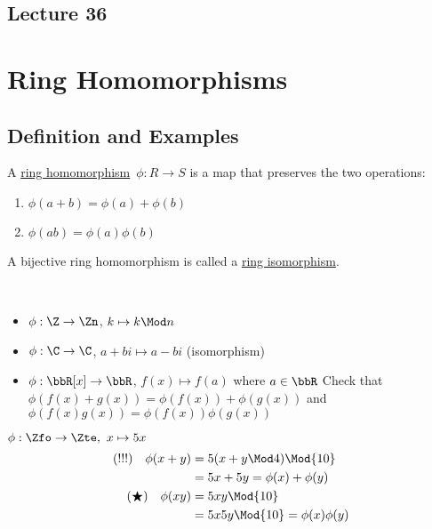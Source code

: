 \subsection*{Lecture 36} %

\section{Ring Homomorphisms}
\subsection{Definition and Examples}
  \begin{definition}
    A \uline{ring homomorphism}\  \( \phi: R\to S \) is a map that preserves the two operations:
    \begin{enumerate}
      \item \( \phi(a+b) = \phi(a) + \phi(b) \)
      \item \( \phi(ab) = \phi(a)\phi(b) \)
    \end{enumerate}
    A bijective ring homomorphism is called a \uline{ring isomorphism}.
  \end{definition}

\begin{examples}\
  \begin{itemize}
    \item \( \phi:\Z\to\Zn \), \( k\mapsto k\Mod n \)
    \item \( \phi:\C\to\C \), \( a+bi\mapsto a-bi \) (isomorphism)
    \item \( \phi:\bbR[x]\to\bbR \), \( f(x)\mapsto f(a) \) where \( a\in\bbR \)
    Check that \( \phi(f(x) + g(x)) = \phi(f(x)) + \phi(g(x)) \) and \( \phi(f(x)g(x)) = \phi(f(x))\phi(g(x)) \)
  \end{itemize}
\end{examples}

\begin{example}
  \( \phi:\Zfo\to\Zte,\ x\mapsto 5x \)
  \begin{align*}
    (!!!)\quad \phi(x+y) &= 5(x+y\Mod 4) \Mod{10} \\
    &= 5x+5y = \phi(x)+\phi(y) \\
    (\bigstar)\quad \phi(xy) &= 5xy \Mod{10} \\
    &= 5x 5y \Mod{10} = \phi(x)\phi(y)
  \end{align*}
\end{example}

